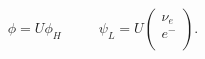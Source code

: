 \begin{equation}
\phi = U\phi_H~~~~~~~~~~~~ \psi_L=U
\left(
\begin{array}{c}
\nu_e\\
e^-\\
\end{array}
\right ).
\end{equation}

